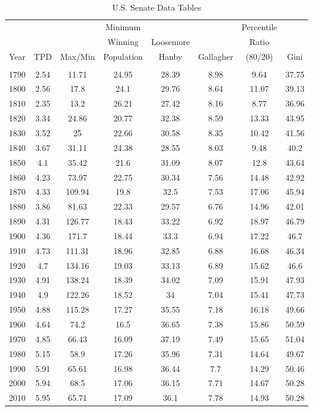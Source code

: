  

\begin{table}[!htbp] \centering 
  \caption{U.S. Senate Data Tables} 
  \label{tab:app_sen} 
\begin{tabular}{c|ccccccc}
 &  &  & Minimum &  &  & Percentile &  \\ 
  &   &   & Winning & Loosemore &  & Ratio &  \\ 
 Year & TPD & Max/Min & Population & Hanby & Gallagher & (80/20) & Gini \\ 
\hline \\[-1.8ex] 
1790 & 2.54 & 11.71 & 24.95 & 28.39 & 8.98 & 9.64 & 37.75 \\
1800 & 2.56 & 17.8 & 24.1 & 29.76 & 8.64 & 11.07 & 39.13 \\
1810 & 2.35 & 13.2 & 26.21 & 27.42 & 8.16 & 8.77 & 36.96 \\
1820 & 3.34 & 24.86 & 20.77 & 32.38 & 8.59 & 13.33 & 43.95 \\
1830 & 3.52 & 25 & 22.66 & 30.58 & 8.35 & 10.42 & 41.56 \\
1840 & 3.67 & 31.11 & 24.38 & 28.55 & 8.03 & 9.48 & 40.2 \\
1850 & 4.1 & 35.42 & 21.6 & 31.09 & 8.07 & 12.8 & 43.64 \\
1860 & 4.23 & 73.97 & 22.75 & 30.34 & 7.56 & 14.48 & 42.92 \\
1870 & 4.33 & 109.94 & 19.8 & 32.5 & 7.53 & 17.06 & 45.94 \\
1880 & 3.86 & 81.63 & 22.33 & 29.57 & 6.76 & 14.96 & 42.01 \\
1890 & 4.31 & 126.77 & 18.43 & 33.22 & 6.92 & 18.97 & 46.79 \\
1900 & 4.36 & 171.7 & 18.44 & 33.3 & 6.94 & 17.22 & 46.7 \\
1910 & 4.73 & 111.31 & 18.96 & 32.85 & 6.88 & 16.68 & 46.34 \\
1920 & 4.7 & 134.16 & 19.03 & 33.13 & 6.89 & 15.62 & 46.6 \\
1930 & 4.91 & 138.24 & 18.39 & 34.02 & 7.09 & 15.91 & 47.93 \\
1940 & 4.9 & 122.26 & 18.52 & 34 & 7.04 & 15.41 & 47.73 \\
1950 & 4.88 & 115.28 & 17.27 & 35.55 & 7.18 & 16.18 & 49.66 \\
1960 & 4.64 & 74.2 & 16.5 & 36.65 & 7.38 & 15.86 & 50.59 \\
1970 & 4.85 & 66.43 & 16.09 & 37.19 & 7.49 & 15.65 & 51.04 \\
1980 & 5.15 & 58.9 & 17.26 & 35.96 & 7.31 & 14.64 & 49.67 \\
1990 & 5.91 & 65.61 & 16.98 & 36.44 & 7.7 & 14.29 & 50.46 \\
2000 & 5.94 & 68.5 & 17.06 & 36.15 & 7.71 & 14.67 & 50.28 \\
2010 & 5.95 & 65.71 & 17.09 & 36.1 & 7.78 & 14.93 & 50.28 \\
\end{tabular}
\tabnotes{}
\end{table}

 

